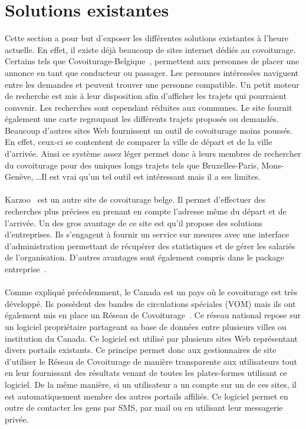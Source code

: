 \documentclass[12pt, a4paper, oneside]{article}
\begin{document}
\section{Solutions existantes}
    Cette section a pour but d'exposer les différentes solutions existantes à l'heure actuelle. En effet, il existe déjà beaucoup de sites internet dédiés au covoiturage. Certains tels que Covoiturage-Belgique~\cite{covoiturage-belgique}, permettent aux personnes de placer une annonce en tant que conducteur ou passager. Les personnes intéressées naviguent entre les demandes et peuvent trouver une personne compatible. Un petit moteur de recherche est mis à leur disposition afin d'afficher les trajets qui pourraient convenir. Les recherches sont cependant réduites aux communes. Le site fournit également une carte regroupant les différents trajets proposés ou demandés. Beaucoup d'autres sites Web fournissent un outil de covoiturage moins poussés. En effet, ceux-ci se contentent de comparer la ville de départ et de la ville d'arrivée. Ainsi ce système assez léger permet donc à leurs membres de rechercher du covoiturage pour des uniques longs trajets tels que Bruxelles-Paris, Mons-Genève, \dots Il est vrai qu'un tel outil est intéressant mais il a ses limites.\\\\
    \indent Karzoo~\cite{karzoo.be} est un autre site de covoiturage belge. Il permet d'effectuer des recherches plus précises en prenant en compte l'adresse même du départ et de l'arrivée. Un des gros avantage de ce site est qu'il propose des solutions d'entreprises. Ils s'engagent à fournir un service sur mesures avec une interface d'administration permettant de récupérer des statistiques et de gérer les salariés de l'organisation. D'autres avantages sont également compris dans le package entreprise~\cite{karzoo.be-entreprise}.\\\\
    \indent Comme expliqué précédemment, le Canada est un pays où le covoiturage est très développé. Ils possèdent des bandes de circulations spéciales (VOM) mais ils ont également mis en place un Réseau de Covoiturage~\cite{covoiturage.ca}. Ce réseau national repose sur un logiciel propriétaire partageant sa base de données entre plusieurs villes ou institution du Canada. Ce logiciel est utilisé par plusieurs sites Web représentant divers portails existants. Ce principe permet donc aux gestionnaires de site d'utiliser le Réseau de Covoiturage de manière transparente aux utilisateurs tout en leur fournissant des résultats venant de toutes les plates-formes utilisant ce logiciel. De la même manière, si un utilisateur a un compte sur un de ces sites, il est automatiquement membre des autres portails affiliés. Ce logiciel permet en outre de contacter les gens par SMS, par mail ou en utilisant leur messagerie privée.\\\\
\end{document}

